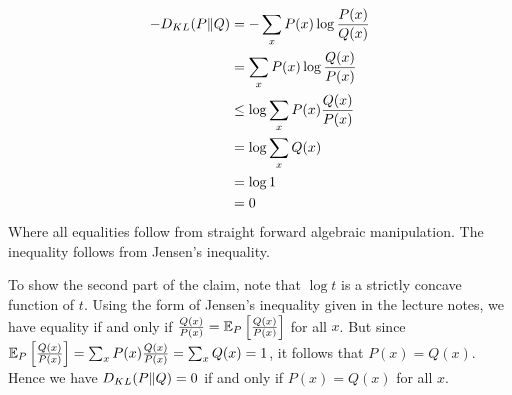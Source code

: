 \begin{answer}
\begin{align*}
-D_{KL}(P\|Q) &= -\sum_x P(x)\log\frac{P(x)}{Q(x)}\\
&= \sum_x P(x)\log\frac{Q(x)}{P(x)}\\
&\leq \log \sum_x P(x)\frac{Q(x)}{P(x)}\\
&= \log \sum_x Q(x)\\
&= \log 1 \\
&= 0
\end{align*}
Where all equalities follow from straight forward algebraic
manipulation. The inequality follows from Jensen's inequality.

To show the second part of the claim, note that $\log t$ is a
strictly concave function of $t$.  Using the form of Jensen's
inequality given in the lecture notes, we have
equality if and only if
$\frac{Q(x)}{P(x)}=\mathbb{E}_P \left[\frac{Q(x)}{P(x)}\right]$
for all $x$.  But since
$\mathbb{E}_P \left[\frac{Q(x)}{P(x)}\right] = \sum_x P(x) \frac{Q(x)}{P(x)} = \sum_x Q(x) = 1$,
it follows that
$P(x)=Q(x)$. Hence we have $D_{KL}(P\|Q)=0$ if and only if
$P(x)=Q(x)$ for all $x$.
\end{answer}
